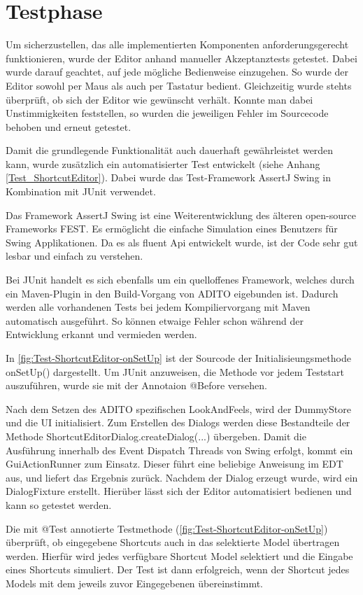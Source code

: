 \section{Testphase}

Um sicherzustellen, das alle implementierten Komponenten anforderungsgerecht funktionieren, wurde der Editor anhand manueller Akzeptanztests getestet. Dabei wurde darauf geachtet, auf jede mögliche Bedienweise einzugehen. So wurde der Editor sowohl per Maus als auch per Tastatur bedient. Gleichzeitig wurde stehts überprüft, ob sich der Editor wie gewünscht verhält. Konnte man dabei Unstimmigkeiten feststellen, so wurden die jeweiligen Fehler im Sourcecode behoben und erneut getestet.

Damit die grundlegende Funktionalität auch dauerhaft gewährleistet werden kann, wurde zusätzlich ein automatisierter Test entwickelt (siehe Anhang \ref{Test_ShortcutEditor}). Dabei wurde das Test-Framework AssertJ Swing in Kombination mit JUnit verwendet.

Das Framework AssertJ Swing ist eine Weiterentwicklung des älteren open-source Frameworks FEST. Es ermöglicht die einfache Simulation eines Benutzers für Swing Applikationen. Da es als fluent Api entwickelt wurde, ist der Code sehr gut lesbar und einfach zu verstehen.

Bei JUnit handelt es sich ebenfalls um ein quelloffenes Framework, welches durch ein Maven-Plugin in den Build-Vorgang von ADITO eigebunden ist. Dadurch werden alle vorhandenen Tests bei jedem Kompiliervorgang mit Maven automatisch ausgeführt. So können etwaige Fehler schon während der Entwicklung erkannt und vermieden werden.



In \autoref{fig:Test-ShortcutEditor-onSetUp} ist der Sourcode der Initialisieungsmethode onSetUp() dargestellt. Um JUnit anzuweisen, die Methode vor jedem Teststart auszuführen, wurde sie mit der Annotaion @Before versehen. 

\vspace{10px}

Nach dem Setzen des ADITO spezifischen LookAndFeels, wird der DummyStore und die UI initialisiert. Zum Erstellen des Dialogs werden diese Bestandteile der Methode ShortcutEditorDialog.createDialog(...) übergeben. Damit die Ausführung innerhalb des Event Dispatch Threads von Swing erfolgt, kommt ein GuiActionRunner zum Einsatz. Dieser führt eine beliebige Anweisung im EDT aus, und liefert das Ergebnis zurück. Nachdem der Dialog erzeugt wurde, wird ein DialogFixture erstellt. Hierüber lässt sich der Editor automatisiert bedienen und kann so getestet werden.



Die mit @Test annotierte Testmethode (\autoref{fig:Test-ShortcutEditor-onSetUp}) überprüft, ob eingegebene Shortcuts auch in das selektierte Model übertragen werden. Hierfür wird jedes verfügbare Shortcut Model selektiert und die Eingabe eines Shortcuts simuliert. Der Test ist dann erfolgreich, wenn der Shortcut jedes Models mit dem jeweils zuvor Eingegebenen übereinstimmt.
\newpage